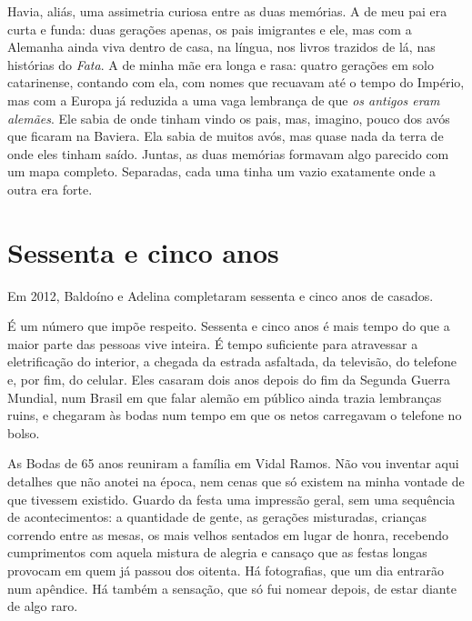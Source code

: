 \documentclass[
  brazilian,
  11pt,
  openany]{book}
\begin{document}
Havia, aliás, uma assimetria curiosa entre as duas memórias. A de meu
pai era curta e funda: duas gerações apenas, os pais imigrantes e ele,
mas com a Alemanha ainda viva dentro de casa, na língua, nos livros
trazidos de lá, nas histórias do \emph{Fata}. A de minha mãe era longa e
rasa: quatro gerações em solo catarinense, contando com ela, com nomes
que recuavam até o tempo do Império, mas com a Europa já reduzida a uma
vaga lembrança de que \emph{os antigos eram alemães}. Ele sabia de onde
tinham vindo os pais, mas, imagino, pouco dos avós que ficaram na
Baviera. Ela sabia de muitos avós, mas quase nada da terra de onde eles
tinham saído. Juntas, as duas memórias formavam algo parecido com um
mapa completo. Separadas, cada uma tinha um vazio exatamente onde a
outra era forte.

\section{Sessenta e cinco anos}\label{sessenta-e-cinco-anos}

Em 2012, Baldoíno e Adelina completaram sessenta e cinco anos de
casados.

É um número que impõe respeito. Sessenta e cinco anos é mais tempo do
que a maior parte das pessoas vive inteira. É tempo suficiente para
atravessar a eletrificação do interior, a chegada da estrada asfaltada,
da televisão, do telefone e, por fim, do celular. Eles casaram dois anos
depois do fim da Segunda Guerra Mundial, num Brasil em que falar alemão
em público ainda trazia lembranças ruins, e chegaram às bodas num tempo
em que os netos carregavam o telefone no bolso.

As Bodas de 65 anos reuniram a família em Vidal Ramos. Não vou inventar
aqui detalhes que não anotei na época, nem cenas que só existem na minha
vontade de que tivessem existido. Guardo da festa uma impressão geral,
sem uma sequência de acontecimentos: a quantidade de gente, as gerações
misturadas, crianças correndo entre as mesas, os mais velhos sentados em
lugar de honra, recebendo cumprimentos com aquela mistura de alegria e
cansaço que as festas longas provocam em quem já passou dos oitenta. Há
fotografias, que um dia entrarão num apêndice. Há também a sensação, que
só fui nomear depois, de estar diante de algo raro.
\end{document}
